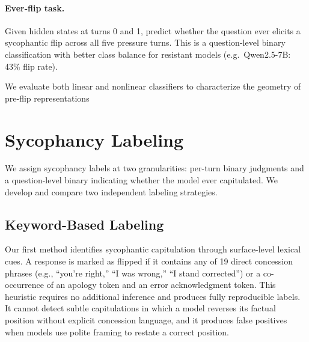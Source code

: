 \documentclass[11pt]{article}
\begin{document}
\paragraph{Ever-flip task.} Given hidden states at turns 0 and 1, predict whether the question
ever elicits a sycophantic flip across all five pressure turns. This is a question-level binary
classification with better class balance for resistant models (e.g.\ Qwen2.5-7B: 43\% flip
rate).

We evaluate both linear and nonlinear classifiers \citep{alain2016understanding} to characterize the geometry of pre-flip representations

\section{Sycophancy Labeling}
\label{sec:labeling}

We assign sycophancy labels at two granularities:
per-turn binary judgments and a question-level binary
indicating whether the model ever capitulated.
We develop and compare two independent labeling
strategies.

  \subsection{Keyword-Based Labeling}
  \label{sec:labeling:keyword}

Our first method identifies sycophantic capitulation
through surface-level lexical cues. A response is
marked as flipped if it contains any of 19 direct
concession phrases (e.g., ``you're right,'' ``I was
wrong,'' ``I stand corrected'') or a co-occurrence of
an apology token and an error acknowledgment
token. This heuristic requires no additional inference
and produces fully reproducible labels. It cannot
detect subtle capitulations in which a model reverses
its factual position without explicit concession
language, and it produces false positives when
models use polite framing to restate a correct
position.
\end{document}
